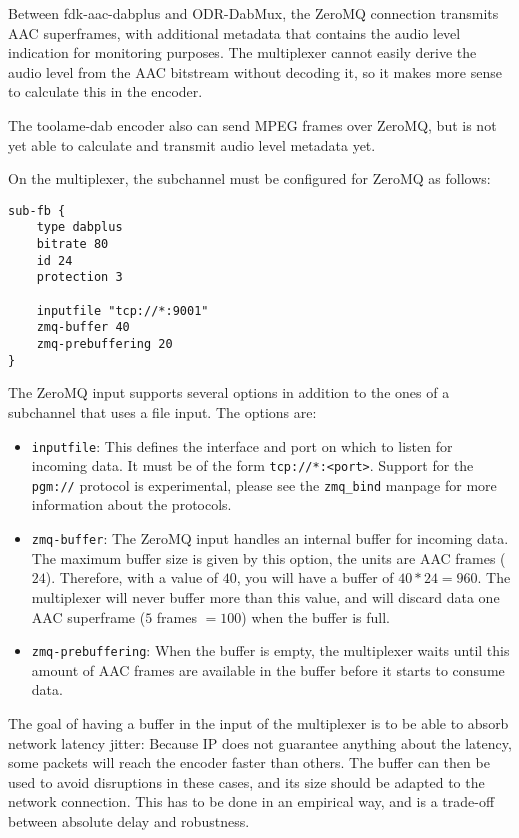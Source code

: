 Between fdk-aac-dabplus and ODR-DabMux, the ZeroMQ connection transmits AAC superframes, with
additional metadata that contains the audio level indication for monitoring purposes. The
multiplexer cannot easily derive the audio level from the AAC bitstream without decoding it, so it
makes more sense to calculate this in the encoder.

The toolame-dab encoder also can send MPEG frames over ZeroMQ, but is not yet able to calculate and
transmit audio level metadata yet.

On the multiplexer, the subchannel must be configured for ZeroMQ as follows:
\begin{lstlisting}
sub-fb {
    type dabplus
    bitrate 80
    id 24
    protection 3

    inputfile "tcp://*:9001"
    zmq-buffer 40
    zmq-prebuffering 20
}
\end{lstlisting}

The ZeroMQ input supports several options in addition to the ones of a subchannel that uses a file
input. The options are:

\begin{itemize}
    \item \texttt{inputfile}: This defines the interface and port on which to listen for incoming
        data. It must be of the form \texttt{tcp://*:<port>}. Support for the \texttt{pgm://}
        protocol is experimental, please see the \texttt{zmq\_bind} manpage for more information
        about the protocols.
    \item \texttt{zmq-buffer}: The ZeroMQ input handles an internal buffer for incoming data. The
        maximum buffer size is given by this option, the units are AAC frames ($24$\ms). Therefore,
        with a value of $40$, you will have a buffer of $40 * 24 = 960$\ms. The multiplexer will
        never buffer more than this value, and will discard data one AAC superframe
        ($5$ frames $= 100$\ms) when the buffer is full.
    \item \texttt{zmq-prebuffering}: When the buffer is empty, the multiplexer waits until this
        amount of AAC frames are available in the buffer before it starts to consume data.
\end{itemize}

The goal of having a buffer in the input of the multiplexer is to be able to absorb network latency
jitter: Because IP does not guarantee anything about the latency, some packets will reach the
encoder faster than others. The buffer can then be used to avoid disruptions in these cases, and its
size should be adapted to the network connection. This has to be done in an empirical way, and is a
trade-off between absolute delay and robustness.

